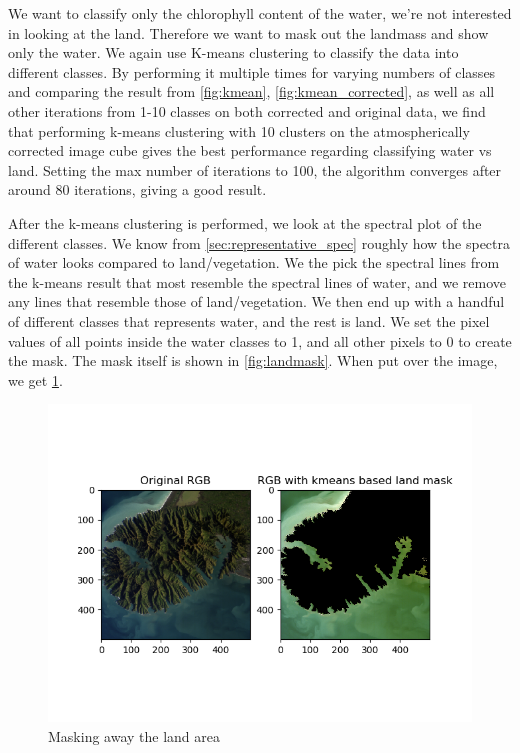 We want to classify only the chlorophyll content of the water, we're not interested 
in looking at the land. Therefore we want to mask out the landmass and show only 
the water. We again use K-means clustering to classify the data into different 
classes. By performing it multiple times for varying numbers of classes and comparing 
the result from \cref{fig:kmean}, \cref{fig:kmean_corrected}, as well as all other 
iterations from 1-10 classes on both corrected and original data, we find that 
performing k-means clustering with 10 clusters on the atmospherically corrected 
image cube gives the best performance regarding classifying water vs land. Setting 
the max number of iterations to 100, the algorithm converges after around 80 iterations, 
giving a good result. 

After the k-means clustering is performed, we look at the spectral plot of the 
different classes. We know from \cref{sec:representative_spec} roughly how the 
spectra of water looks compared to land/vegetation. We the pick the spectral lines 
from the k-means result that most resemble the spectral lines of water, and we remove 
any lines that resemble those of land/vegetation. We then end up with a handful of 
different classes that represents water, and the rest is land. We set the pixel values 
of all points inside the water classes to 1, and all other pixels to 0 to create the 
mask. The mask itself is shown in \cref{fig:landmask}. When put over the image, we get 
\cref{fig:mask_rgb}.


\begin{figure}[h!]
    \centering
    \includegraphics[width=\textwidth]{../fig/rgb_masked.png}
    \caption{Masking away the land area}
    \label{fig:mask_rgb}
\end{figure}


